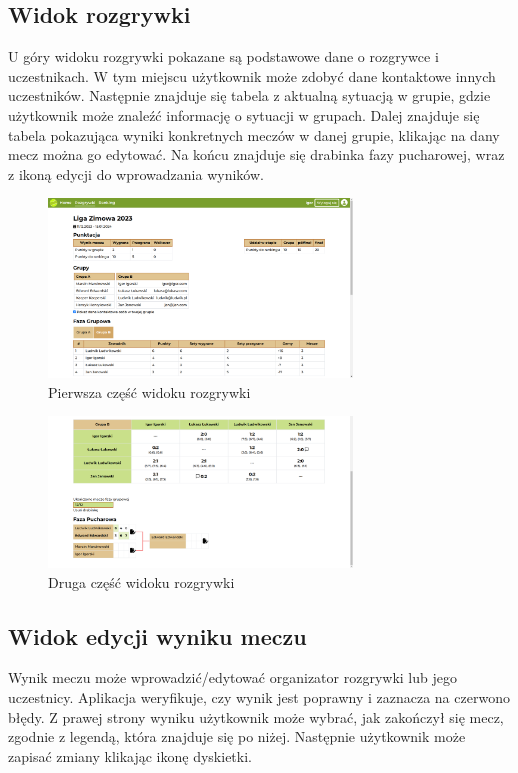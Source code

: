 \documentclass[shortabstract]{iithesis}
\begin{document}
\subsection{Widok rozgrywki}
U góry widoku rozgrywki pokazane są podstawowe dane o rozgrywce i uczestnikach.
W tym miejscu użytkownik może zdobyć dane kontaktowe innych uczestników.
Następnie znajduje się tabela z aktualną sytuacją w grupie, gdzie użytkownik może znaleźć informację o sytuacji w grupach.
Dalej znajduje się tabela pokazująca wyniki konkretnych meczów w danej grupie, klikając na dany mecz można go edytować.
Na końcu znajduje się drabinka fazy pucharowej, wraz z ikoną edycji do wprowadzania wyników.
\begin{figure}[H]
    \centering
    \includegraphics[width=0.72\textwidth,valign=t]{assets/interfejs/rozgrywka_desktop.png}
    \caption{Pierwsza część widoku rozgrywki}
\end{figure}
\begin{figure}[H]
    \centering
    \includegraphics[width=0.72\textwidth,valign=t]{assets/interfejs/rozgrywka_desktop2.png}
    \caption{Druga część widoku rozgrywki}
\end{figure}

\subsection{Widok edycji wyniku meczu}
Wynik meczu może wprowadzić\slash edytować organizator rozgrywki lub jego uczestnicy.
Aplikacja weryfikuje, czy wynik jest poprawny i zaznacza na czerwono błędy. Z prawej strony wyniku
użytkownik może wybrać, jak zakończył się mecz, zgodnie z legendą, która znajduje się po niżej.
Następnie użytkownik może zapisać zmiany klikając ikonę dyskietki.
\end{document}
